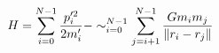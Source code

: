 \documentclass[preview]{standalone}
\begin{document}
\begin{align*}
\special{dvisvgm:raw <g id='unique000'>}H = \sum_{i=0}^{N-1}\frac{p'^2_i}{2m_i'} - \sim_{i=0}^{N-1} \sum_{j=i+1}^{N-1} \frac{G m_i m_j}{\norm{r_i - r_j}}\special{dvisvgm:raw </g>}
\end{align*}
\end{document}
